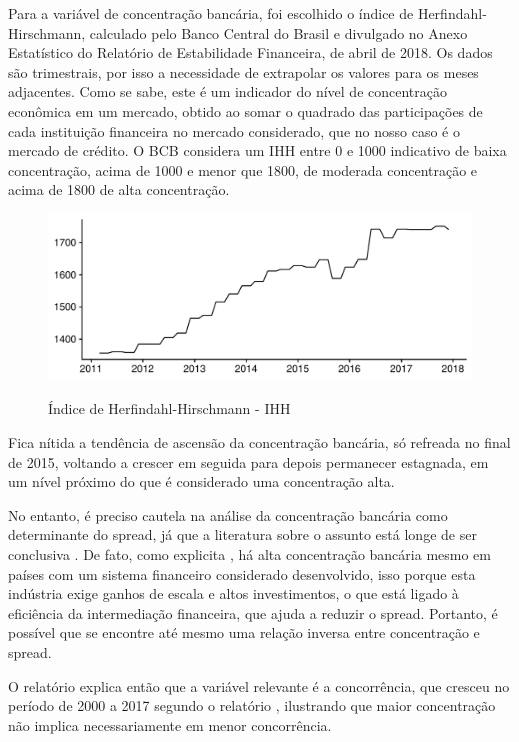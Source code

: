 \documentclass[a4paper, article, 12pt, openany, oneside, english, brazil]{abntex2}
\numberwithin{equation}{section}
\begin{document}
    Para a variável de concentração bancária, foi escolhido o índice de Herfindahl-Hirschmann, calculado pelo Banco Central do Brasil e divulgado no Anexo Estatístico do Relatório de Estabilidade Financeira, de abril de 2018. Os dados são trimestrais, por isso a necessidade de extrapolar os valores para os meses adjacentes. Como se sabe, este é um indicador do nível de concentração econômica em um mercado, obtido ao somar o quadrado das participações de cada instituição financeira no mercado considerado, que no nosso caso é o mercado de crédito. O BCB considera um IHH entre 0 e 1000 indicativo de baixa concentração, acima de 1000 e menor que 1800, de moderada concentração e acima de 1800 de alta concentração.

\begin{figure}[h]
  \centering
  \caption{Índice de Herfindahl-Hirschmann - IHH}
      \includegraphics[width = \textwidth, scale=0.75]{IHH.pdf}
      \label{ihh}
\end{figure}
    
    Fica nítida a tendência de ascensão da concentração bancária, só refreada no final de 2015, voltando a crescer em seguida para depois permanecer estagnada, em um nível próximo do que é considerado uma concentração alta.

    No entanto, é preciso cautela na análise da concentração bancária como determinante do spread, já que a literatura sobre o assunto está longe de ser conclusiva \cite[p.~11]{reb2017}. De fato, como explicita , há alta concentração bancária mesmo em países com um sistema financeiro considerado desenvolvido, isso porque esta indústria exige ganhos de escala e altos investimentos, o que está ligado à eficiência da intermediação financeira, que ajuda a reduzir o spread. Portanto, é possível que se encontre até mesmo uma relação inversa entre concentração e spread. 

    O relatório explica então que a variável relevante é a concorrência, que cresceu no período de 2000 a 2017 segundo o relatório \cite[p.~11]{reb2017}, ilustrando que maior concentração não implica necessariamente em menor concorrência.
\end{document}
